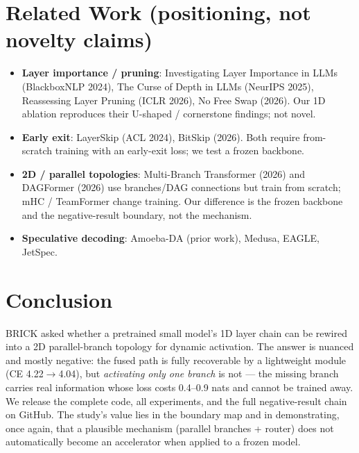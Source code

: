 \documentclass[11pt,a4paper]{article}
\begin{document}
\section{Related Work (positioning, not novelty claims)}
\begin{itemize}[leftmargin=*]
  \item \textbf{Layer importance / pruning}: Investigating Layer Importance in LLMs
        (BlackboxNLP 2024), The Curse of Depth in LLMs (NeurIPS 2025),
        Reassessing Layer Pruning (ICLR 2026), No Free Swap (2026). Our 1D ablation
        reproduces their U-shaped / cornerstone findings; not novel.
  \item \textbf{Early exit}: LayerSkip (ACL 2024), BitSkip (2026). Both require
        from-scratch training with an early-exit loss; we test a frozen backbone.
  \item \textbf{2D / parallel topologies}: Multi-Branch Transformer (2026) and
        DAGFormer (2026) use branches/DAG connections but train from scratch;
        mHC / TeamFormer change training. Our difference is the frozen backbone and
        the negative-result boundary, not the mechanism.
  \item \textbf{Speculative decoding}: Amoeba-DA (prior work), Medusa, EAGLE, JetSpec.
\end{itemize}

\section{Conclusion}
BRICK asked whether a pretrained small model's 1D layer chain can be rewired into a
2D parallel-branch topology for dynamic activation. The answer is nuanced and mostly
negative: the fused path is fully recoverable by a lightweight module (CE 4.22$\to$4.04),
but \emph{activating only one branch} is not --- the missing branch carries real
information whose loss costs 0.4--0.9 nats and cannot be trained away. We release the
complete code, all experiments, and the full negative-result chain on GitHub. The
study's value lies in the boundary map and in demonstrating, once again, that a plausible
mechanism (parallel branches + router) does not automatically become an accelerator
when applied to a frozen model.
\end{document}
